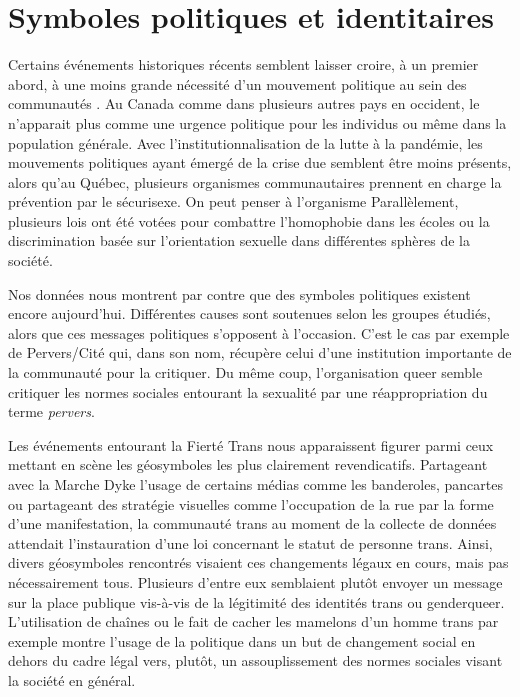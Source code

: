 \section{Symboles politiques et identitaires}
\label{sec:symboles_politiques_et_identitaire}
Certains événements historiques récents semblent laisser croire, à un premier abord, à une moins grande nécessité d'un mouvement politique au sein des communautés \lgbt{}.
Au Canada comme dans plusieurs autres pays en occident, le \sida{} n'apparait plus comme une urgence politique pour les individus \lgbt{} ou même dans la population générale. 
Avec l'institutionnalisation de la lutte à la pandémie, les mouvements politiques ayant  émergé de la crise due \vih{} semblent être moins présents, alors qu'au Québec, plusieurs organismes communautaires prennent en charge la prévention par le sécurisexe.
On peut penser à l'organisme \miels{}
Parallèlement, plusieurs lois ont été votées pour combattre l'homophobie dans les écoles ou la discrimination basée sur l'orientation sexuelle dans différentes sphères de la société.

Nos données nous montrent par contre que des symboles politiques existent encore aujourd'hui.
Différentes causes sont soutenues selon les groupes étudiés, alors que ces messages politiques s'opposent à l'occasion.
C'est le cas par exemple de Pervers/Cité qui, dans son nom, récupère celui d'une institution importante de la communauté \lgbt{} pour la critiquer.
Du même coup, l'organisation queer semble critiquer les normes sociales entourant la sexualité par une réappropriation du terme \emph{pervers}. 

Les événements entourant la Fierté Trans nous apparaissent figurer parmi ceux mettant en scène les géosymboles les plus clairement revendicatifs.
Partageant avec la Marche Dyke l'usage de certains médias comme les banderoles, pancartes ou partageant des stratégie visuelles comme l'occupation de la rue par la forme d'une manifestation, la communauté trans au moment de la collecte de données attendait l'instauration d'une loi concernant le statut de personne trans.
Ainsi, divers géosymboles rencontrés visaient ces changements légaux en cours, mais pas nécessairement tous.
Plusieurs d'entre eux semblaient plutôt envoyer un message sur la place publique vis-à-vis de la légitimité des identités trans ou genderqueer.
L'utilisation de chaînes ou le fait de cacher les mamelons d'un homme trans par exemple montre l'usage de la politique dans un but de changement social en dehors du cadre légal vers, plutôt, un assouplissement des normes sociales visant la société en général.

